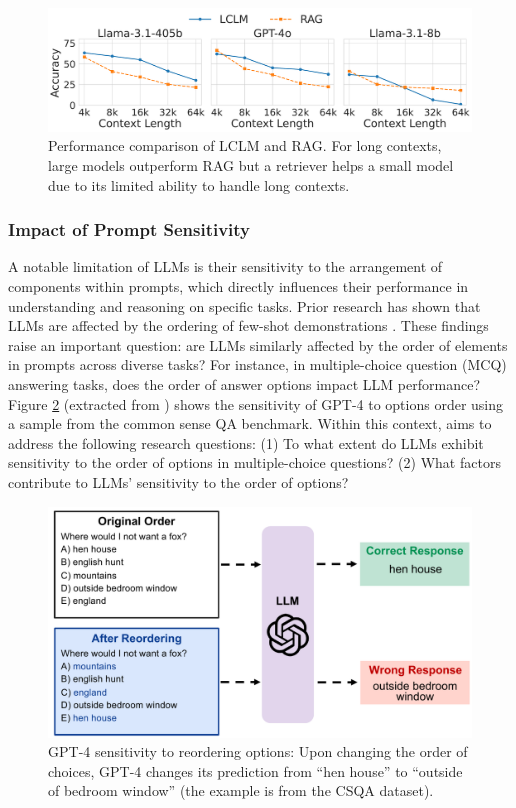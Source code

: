 \begin{figure}[ht]
    \centering
    \includegraphics[width=.8\linewidth]{submissions/Estevam2024/figures/lclm_vs_rag_all_models.pdf}
    \caption{Performance comparison of LCLM and RAG. For long contexts, large models outperform RAG but a retriever helps a small model due to its limited ability to handle long contexts. }
    \label{fig:rag}
\end{figure}

\subsubsection{Impact of Prompt Sensitivity}

A notable limitation of LLMs is their sensitivity to the arrangement of components within prompts, which directly influences their performance in understanding and reasoning on specific tasks. Prior research has shown that LLMs are affected by the ordering of few-shot demonstrations \cite{zhao2021calibrate}. These findings raise an important question: are LLMs similarly affected by the order of elements in prompts across diverse tasks? For instance, in multiple-choice question (MCQ) answering tasks, does the order of answer options impact LLM performance? Figure \ref{fig:over} (extracted from \cite{pezeshkpour2024large}) shows the sensitivity of GPT-4 to options order using a sample from the common sense QA benchmark.  Within this context, \cite{pezeshkpour2024large} aims to address the following research questions: 
(1) To what extent do LLMs exhibit sensitivity to the order of options in multiple-choice questions? 
(2) What factors contribute to LLMs' sensitivity to the order of options? 

\begin{figure}[th!]
    \centering
    \includegraphics[width=0.7\columnwidth]{submissions/Estevam2024/figures/overview-mcq.pdf}
    \caption{{GPT-4 sensitivity to reordering options:} Upon changing the order of choices, GPT-4 changes its prediction from ``hen house'' to ``outside of bedroom window'' (the example is from the CSQA dataset).}
    \label{fig:over}
\end{figure}

